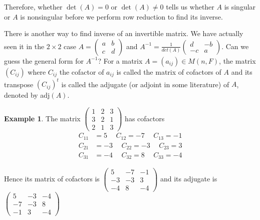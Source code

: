 \documentclass[12pt]{amsart}
\theoremstyle{definition}
\newtheorem{example}[theorem]{Example}
\begin{document}
Therefore, whether $\det(A) = 0$ or $\det(A) \neq 0$ tells us whether $A$ is singular or $A$ is nonsingular before we perform row reduction to find its inverse.

There is another way to find inverse of an invertible matrix. We have actually seen it in the $2 \times 2$ case $A = \left(\begin{array}{cc} a & b\\ c & d \end{array}\right)$ and $A^{-1} = \frac{1}{det(A)} \left(\begin{array}{cc} d & -b\\ -c & a \end{array}\right)$. Can we guess the general form for $A^{-1}$?
\dfn For a matrix $A = (a_{ij}) \in M(n, F)$, the matrix $(C_{ij})$ where $C_{ij}$ the cofactor of $a_{ij}$ is called the matrix of cofactors of $A$ and its transpose $(C_{ij})^t$ is called the adjugate (or adjoint in some literature) of $A$, denoted by adj$(A)$.
\begin{example}\label{adjugatematrix} The matrix $\left(\begin{array}{ccc} 1 & 2 & 3\\ 3 & 2 &1\\ 2 & 1 & 3 \end{array}\right)$ has cofactors
\begin{align*}
C_{11} & = 5 \hspace{15pt} C_{12} = -7 \hspace{15pt} C_{13} = -1 \\
C_{21} & = -3 \hspace{15pt} C_{22} = -3 \hspace{15pt} C_{23} = 3 \\
C_{31} & = -4 \hspace{15pt} C_{32} = 8 \hspace{15pt} C_{33} = -4
\end{align*}

Hence its matrix of cofactors is $\left(\begin{array}{ccc} 5 & -7 & -1\\ -3 & -3 & 3\\ -4 & 8 & -4 \end{array}\right)$ and its adjugate is $\left(\begin{array}{ccc} 5 & -3 & -4 \\ -7 & -3 & 8 \\ -1 & 3 & -4 \end{array}\right)$
\end{example}
\end{document}
